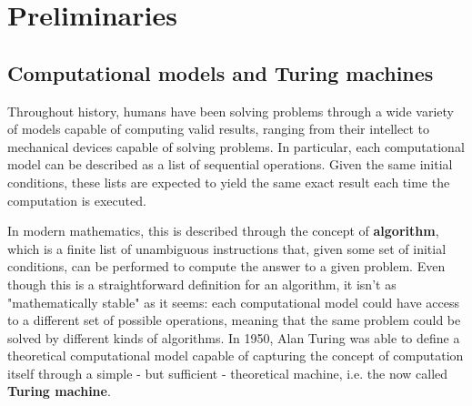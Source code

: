 
\chapter{Preliminaries} \label{chap:preliminaries}

\section{Computational models and Turing machines}

Throughout history, humans have been solving problems through a wide variety of models capable of computing valid results, ranging from their intellect to mechanical devices capable of solving problems. In particular, each computational model can be described as a list of sequential operations. Given the same initial conditions, these lists are expected to yield the same exact result each time the computation is executed.

In modern mathematics, this is described through the concept of \textbf{algorithm}, which is a finite list of unambiguous instructions that, given some set of initial conditions, can be performed to compute the answer to a given problem. Even though this is a straightforward definition for an algorithm, it isn't as "mathematically stable" as it seems: each computational model could have access to a different set of possible operations, meaning that the same problem could be solved by different kinds of algorithms. In 1950, Alan Turing was able to define a theoretical computational model capable of capturing the concept of computation itself through a simple - but sufficient - theoretical machine, i.e. the now called \textbf{Turing machine}.  \cite{complexity_arora_barak, sipser_computation}


